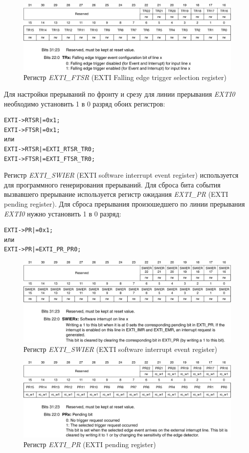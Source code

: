 \begin{figure}[H]
\begin{center}
\includegraphics[scale=0.25]{Image/69.jpg} 
\end{center}
\caption{Регистр \textit{EXTI\_FTSR} (EXTI Falling edge trigger selection register)}
\end{figure}
Для настройки прерываний по фронту и срезу для линии прерывания \textit{EXTI0} необходимо установить 1 в 0 разряд обоих регистров:
\begin{verbatim}
EXTI->RTSR|=0x1; 
EXTI->FTSR|=0x1;
или
EXTI->RTSR|=EXTI_RTSR_TR0;
EXTI->FTSR|=EXTI_FTSR_TR0;
\end{verbatim}

Регистр \textit{EXTI\_SWIER} (EXTI software interrupt event register) используется для программного генерирования прерываний. Для сброса бита события вызвавшего прерывание используется регистр ожидания \textit{EXTI\_PR} (EXTI pending register). Для сброса прерывания произошедшего по линии прерывания \textit{EXTI0} нужно установить 1 в 0 разряд:
\begin{verbatim}
EXTI->PR|=0x1;
или
EXTI->PR|=EXTI_PR_PR0;
\end{verbatim}
\begin{figure}[H]
\begin{center}
\includegraphics[scale=0.25]{Image/70.jpg} 
\end{center}
\caption{Регистр \textit{EXTI\_SWIER} (EXTI software interrupt event register)}
\end{figure}
\begin{figure}[H]
\begin{center}
\includegraphics[scale=0.25]{Image/71.jpg} 
\end{center}
\caption{Регистр \textit{EXTI\_PR} (EXTI pending register)}
\end{figure}

